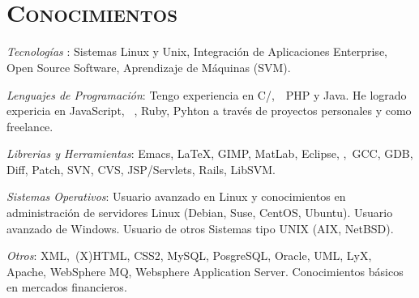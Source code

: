 \begin{resume}
 \begin{formatb}
   \\
   \body\\
 \end{formatb}



\section{\textsc{Conocimientos}}

\emph{Tecnolog\'{i}as }: Sistemas Linux y Unix, Integraci\'{o}n de
Aplicaciones Enterprise, Open Source Software, Aprendizaje de
M\'{a}quinas (SVM).


\emph{Lenguajes de Programaci\'{o}n}: Tengo experiencia en
C/\Cplusplus,\ \ PHP y Java. He logrado expericia en
JavaScript, \ \CSharp, Ruby, Pyhton a trav\'{e}s de proyectos
personales y como freelance.

\emph{Librerias y Herramientas}: Emacs, \LaTeX, GIMP, MatLab, Eclipse, \GTKSharp,\ GCC, GDB, Diff, Patch, SVN, CVS, JSP/Servlets, Rails, LibSVM.

\emph{Sistemas Operativos}: Usuario avanzado en Linux  y conocimientos en
administraci\'{o}n de servidores Linux (Debian, Suse, CentOS, Ubuntu). Usuario avanzado de Windows. Usuario de
otros Sistemas tipo UNIX (AIX, NetBSD).

\emph{Otros}: XML,\ (X)HTML, CSS2, MySQL, PosgreSQL, Oracle,
UML, LyX, Apache, WebSphere MQ, Websphere Application
Server. Conocimientos b\'{a}sicos en mercados financieros.



\end{resume}
